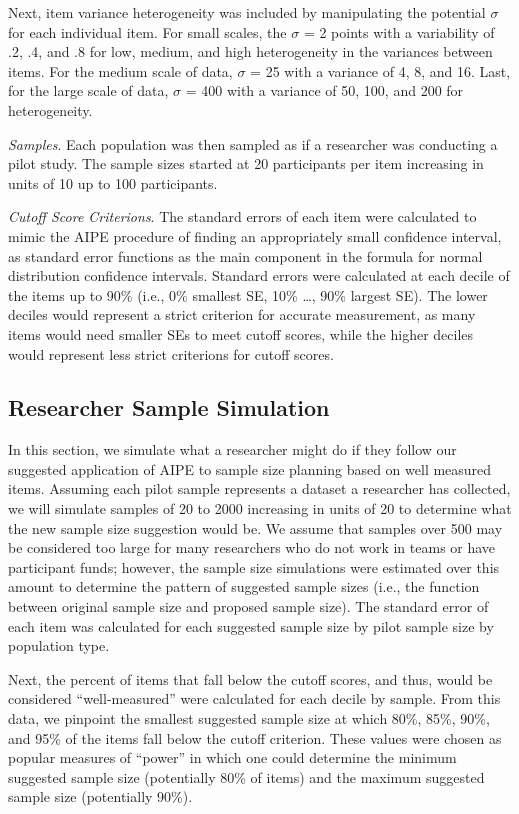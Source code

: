 \documentclass[
  man]{apa6}
\begin{document}
Next, item variance heterogeneity was included by manipulating the potential \(\sigma\) for each individual item. For small scales, the \(\sigma\) = 2 points with a variability of .2, .4, and .8 for low, medium, and high heterogeneity in the variances between items. For the medium scale of data, \(\sigma\) = 25 with a variance of 4, 8, and 16. Last, for the large scale of data, \(\sigma\) = 400 with a variance of 50, 100, and 200 for heterogeneity.

\emph{Samples}. Each population was then sampled as if a researcher was conducting a pilot study. The sample sizes started at 20 participants per item increasing in units of 10 up to 100 participants.

\emph{Cutoff Score Criterions}. The standard errors of each item were calculated to mimic the AIPE procedure of finding an appropriately small confidence interval, as standard error functions as the main component in the formula for normal distribution confidence intervals. Standard errors were calculated at each decile of the items up to 90\% (i.e., 0\% smallest SE, 10\% \ldots, 90\% largest SE). The lower deciles would represent a strict criterion for accurate measurement, as many items would need smaller SEs to meet cutoff scores, while the higher deciles would represent less strict criterions for cutoff scores.

\hypertarget{researcher-sample-simulation}{%
\subsection{Researcher Sample Simulation}\label{researcher-sample-simulation}}

In this section, we simulate what a researcher might do if they follow our suggested application of AIPE to sample size planning based on well measured items. Assuming each pilot sample represents a dataset a researcher has collected, we will simulate samples of 20 to 2000 increasing in units of 20 to determine what the new sample size suggestion would be. We assume that samples over 500 may be considered too large for many researchers who do not work in teams or have participant funds; however, the sample size simulations were estimated over this amount to determine the pattern of suggested sample sizes (i.e., the function between original sample size and proposed sample size). The standard error of each item was calculated for each suggested sample size by pilot sample size by population type.

Next, the percent of items that fall below the cutoff scores, and thus, would be considered ``well-measured'' were calculated for each decile by sample. From this data, we pinpoint the smallest suggested sample size at which 80\%, 85\%, 90\%, and 95\% of the items fall below the cutoff criterion. These values were chosen as popular measures of ``power'' in which one could determine the minimum suggested sample size (potentially 80\% of items) and the maximum suggested sample size (potentially 90\%).
\end{document}
